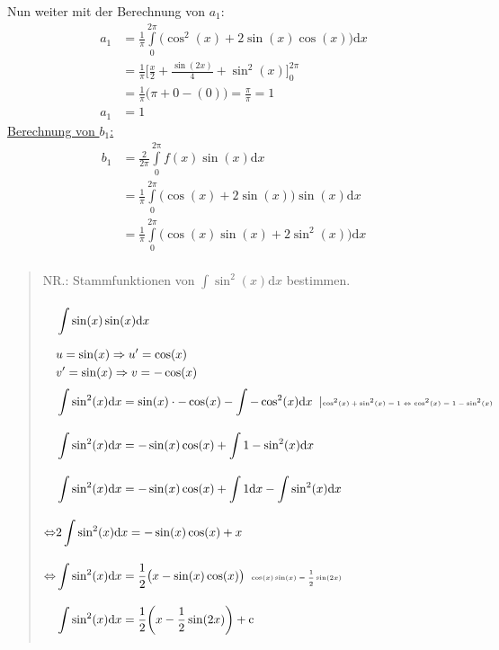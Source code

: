 Nun weiter mit der Berechnung von $ a_1 $:\\
\begin{align*}
a_1&=\frac{1}{\pi}\int\limits_{0}^{2\pi} \big(\cos^2(x)+2\sin(x)\cos(x)\big)\mathrm{d}x\\
&=\frac{1}{\pi}\bigg[\frac{x}{2}+\frac{\sin(2x)}{4}+\sin^2(x)\bigg]^{2\pi}_0\\
&=\frac{1}{\pi}\big(\pi+0-(0)\big)=\frac{\pi}{\pi}=1\\
a_1&=1
\end{align*}
\underline{ Berechnung von $ b_1 $:}\\
\begin{align*}
b_1&=\frac{2}{2\pi}\int\limits_{0}^{\mathrm{2\pi}}f(x)\sin( x)\mathrm{d}x  \\
&=\frac{1}{\pi}\int\limits_{0}^{2\pi} \big(\cos(x)+2\sin(x)\big)\sin(x)\mathrm{d}x\\
&=\frac{1}{\pi}\int\limits_{0}^{2\pi} \big(\cos(x)\sin(x)+2\sin^2(x)\big)\mathrm{d}x\\
\end{align*}
\begin{quote}
NR.: Stammfunktionen von $ \int\limits_{}^{}\sin^2(x) \mathrm{d}x $ bestimmen.\\
\begin{align*}
&\int\limits_{}^{} \sin(x)\sin(x)\mathrm{d}x\\
&u=\sin(x)\Rightarrow u'=\cos(x)\\
&v'=\sin(x)\Rightarrow v=-\cos(x)\\
&\int\limits_{}^{} \sin^2(x)\mathrm{d}x=\sin(x)\cdot -\cos(x)-\int\limits_{}^{} -\cos^2(x)\mathrm{d}x\;\;\lvert\text{\tiny $\cos^2(x)+\sin^2(x)=1\Leftrightarrow \cos^2(x)=1-\sin^2(x)$ }\\
&\int\limits_{}^{} \sin^2(x)\mathrm{d}x=-\sin(x)\cos(x)+\int\limits_{}^{} 1-\sin^2(x)\mathrm{d}x\\
&\int\limits_{}^{} \sin^2(x)\mathrm{d}x=-\sin(x)\cos(x)+\int\limits_{}^{} 1\mathrm{d}x-\int\limits_{}^{} \sin^2(x)\mathrm{d}x\\
\Leftrightarrow&2\int\limits_{}^{} \sin^2(x)\mathrm{d}x=-\sin(x)\cos(x)+x\\
\Leftrightarrow&\int\limits_{}^{} \sin^2(x)\mathrm{d}x=\frac{1}{2}\big(x-\sin(x)\cos(x)\big)\;\;\text{\tiny$\cos(x)\sin(x)=\frac{1}{2}\sin(2x)  $ }\\
&\int\limits_{}^{} \sin^2(x)\mathrm{d}x=\frac{1}{2}\bigg(x-\frac{1}{2}\sin(2x)\bigg)+\mathrm{c}
\end{align*}
\end{quote}
